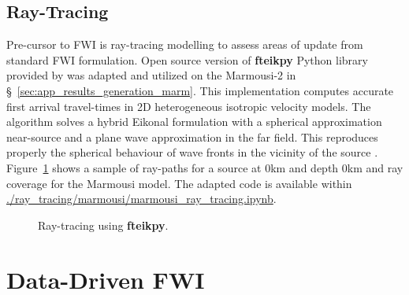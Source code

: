 \subsection{Ray-Tracing}
Pre-cursor to FWI is ray-tracing modelling to assess areas of update from standard FWI formulation. Open source version of \textbf{fteikpy} Python library provided by \citet{Noble2014} was adapted and utilized on the Marmousi-2 in §~\ref{sec:app_results_generation_marm}. This implementation computes accurate first arrival travel-times in 2D heterogeneous isotropic velocity models. The algorithm solves a hybrid Eikonal formulation with a spherical approximation near-source and a plane wave approximation in the far field. This reproduces properly the spherical behaviour of wave fronts in the vicinity of the source \citep{Noble2014}. Figure~\ref{fig:fteikpy_ray_tracing_marmousi} shows a sample of ray-paths for a source at 0km and depth 0km and ray coverage for the Marmousi model. The adapted code is available within \href{https://gitfront.io/r/zerafachris/52df30fb666ba880749c8e951a3d056ce628a6cd/PhD/blob/code/ray_tracing/marmousi/marmousi_ray_tracing.ipynb}{\url{./ray_tracing/marmousi/marmousi_ray_tracing.ipynb}}.
\clearpage
\begin{figure}[ht]
        \centering

        \caption[Ray-tracing using \textbf{fteikpy}.]{Ray-tracing using \textbf{fteikpy}.}
        \label{fig:fteikpy_ray_tracing_marmousi}
\end{figure}

\section{Data-Driven FWI}\label{sec:app_results_summary_results_exp_1}
